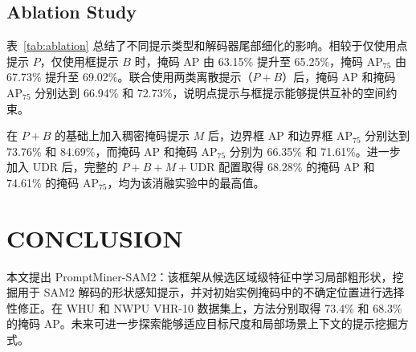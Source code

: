 \documentclass{article}
\begin{document}
\subsection{Ablation Study}
\vspace{-0.35em}
表~\ref{tab:ablation} 总结了不同提示类型和解码器尾部细化的影响。相较于仅使用点提示 $P$，仅使用框提示 $B$ 时，掩码 AP 由 63.15\% 提升至 65.25\%，掩码 AP$_{75}$ 由 67.73\% 提升至 69.02\%。联合使用两类离散提示（$P{+}B$）后，掩码 AP 和掩码 AP$_{75}$ 分别达到 66.94\% 和 72.73\%，说明点提示与框提示能够提供互补的空间约束。

在 $P{+}B$ 的基础上加入稠密掩码提示 $M$ 后，边界框 AP 和边界框 AP$_{75}$ 分别达到 73.76\% 和 84.69\%，而掩码 AP 和掩码 AP$_{75}$ 分别为 66.35\% 和 71.61\%。进一步加入 UDR 后，完整的 $P{+}B{+}M{+}\mathrm{UDR}$ 配置取得 68.28\% 的掩码 AP 和 74.61\% 的掩码 AP$_{75}$，均为该消融实验中的最高值。

\section{CONCLUSION}
本文提出 PromptMiner-SAM2：该框架从候选区域级特征中学习局部粗形状，挖掘用于 SAM2 解码的形状感知提示，并对初始实例掩码中的不确定位置进行选择性修正。在 WHU 和 NWPU VHR-10 数据集上，方法分别取得 73.4\% 和 68.3\% 的掩码 AP。未来可进一步探索能够适应目标尺度和局部场景上下文的提示挖掘方式。
\end{document}
